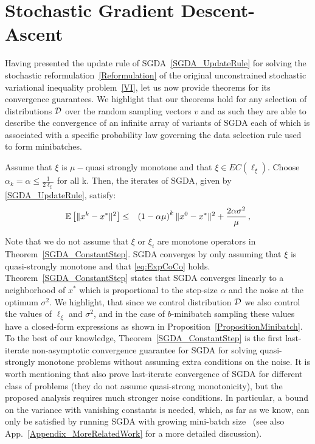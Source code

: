 \documentclass{article}
\begin{document}
\section{Stochastic Gradient Descent-Ascent}
\label{Section_SGDA}
Having presented the update rule of SGDA~\eqref{SGDA_UpdateRule} for solving the stochastic reformulation~\eqref{Reformulation} of the original unconstrained stochastic variational inequality problem~\eqref{VI}, let us now provide theorems for its convergence guarantees. We highlight that our theorems hold for any selection of distributions ${\cal D}$ over the random sampling vectors $v$ and as such they are able to describe the convergence of an infinite array of variants of SGDA each of which is associated with a specific probability law governing the data selection rule used to form minibatches.
\begin{theorem}
\label{SGDA_ConstantStep}
Assume that $\xi$ is $\mu-$quasi strongly monotone and that $\xi \in EC( \ell_{\xi})$. Choose $\alpha_k=\alpha \leq \frac{1}{2\ell_\xi}$ for all k. Then, the iterates of SGDA, given by \eqref{SGDA_UpdateRule}, satisfy:
\vspace{-3mm}
\begin{eqnarray}
\label{nakns}
\mathbb{E} \left[ \|x^{k}-x^*\|^2 \right]&\leq& \left(1-\alpha \mu \right)^k \|x^0-x^*\|^2  + \frac{2 \alpha \sigma^2}{ \mu} \, ,
\end{eqnarray}
\end{theorem}
Note that we do not assume that $\xi$ or $\xi_i$ are monotone operators in Theorem~\ref{SGDA_ConstantStep}. SGDA converges by only assuming that $\xi$ is quasi-strongly monotone and that \ref{eq:ExpCoCo} holds. Theorem~\ref{SGDA_ConstantStep} states that SGDA converges linearly to a neighborhood of $x^*$ which is proportional to the step-size $\alpha$ and the noise at the optimum $\sigma^2$.  We highlight, that since we control distribution ${\cal D}$ we also control the values of $\ell_\xi$ and $\sigma^2$, and in the case of $b$-minibatch sampling these values have a closed-form expressions as shown in Proposition~\ref{PropositionMinibatch}.  To the best of our knowledge, Theorem~\ref{SGDA_ConstantStep} is the first last-iterate non-asymptotic convergence guarantee for SGDA for solving quasi-strongly monotone problems without assuming extra conditions on the noise. It is worth mentioning that \citet{lin2020finite} also prove last-iterate convergence of SGDA for different class of problems (they do not assume quasi-strong monotonicity), but the proposed analysis requires much stronger noise conditions. In particular, a bound on the variance with vanishing constants is needed, which, as far as we know, can only be satisfied by running SGDA with growing mini-batch size~\citep{friedlander2012hybrid} (see also App.~\ref{Appendix_MoreRelatedWork} for a more detailed discussion).
\end{document}
